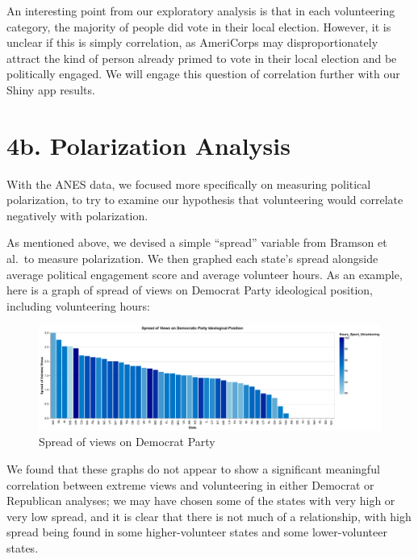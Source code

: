 \documentclass[
  letterpaper,
  DIV=11,
  numbers=noendperiod]{scrartcl}
\begin{document}
An interesting point from our exploratory analysis is that in each
volunteering category, the majority of people did vote in their local
election. However, it is unclear if this is simply correlation, as
AmeriCorps may disproportionately attract the kind of person already
primed to vote in their local election and be politically engaged. We
will engage this question of correlation further with our Shiny app
results.

\section{4b. Polarization Analysis}\label{b.-polarization-analysis}

With the ANES data, we focused more specifically on measuring political
polarization, to try to examine our hypothesis that volunteering would
correlate negatively with polarization.

As mentioned above, we devised a simple ``spread'' variable from Bramson
et al.~to measure polarization. We then graphed each state's spread
alongside average political engagement score and average volunteer
hours. As an example, here is a graph of spread of views on Democrat
Party ideological position, including volunteering hours:

\begin{figure}[H]

{\centering \includegraphics{dem_graph_spread_2.png}

}

\caption{Spread of views on Democrat Party}

\end{figure}%

We found that these graphs do not appear to show a significant
meaningful correlation between extreme views and volunteering in either
Democrat or Republican analyses; we may have chosen some of the states
with very high or very low spread, and it is clear that there is not
much of a relationship, with high spread being found in some
higher-volunteer states and some lower-volunteer states.
\end{document}
